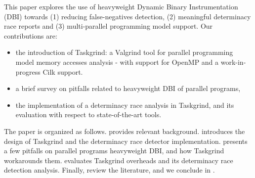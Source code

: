 This paper explores the use of heavyweight Dynamic Binary Instrumentation (DBI) towards (1) reducing false-negatives detection, (2) meaningful determinacy race reports and (3) multi-parallel programming model support.
Our contributions are:
\begin{itemize}
	\item	the introduction of Taskgrind: a Valgrind tool for parallel programming model memory accesses analysis - with support for OpenMP and a work-in-progress Cilk support.
	\item 	a brief survey on pitfalls related to heavyweight DBI of parallel programs,
	\item 	the implementation of a determinacy race analysis in Taskgrind, and its evaluation with respect to state-of-the-art tools.
\end{itemize}

The paper is organized as follows.
 provides relevant background.
 introduces the design of Taskgrind and the determinacy race detector implementation.
 presents a few pitfalls on parallel programs heavyweight DBI, and how Taskgrind workarounds them.
 evaluates Taskgrind overheads and its determinacy race detection analysis.
Finally,  review the literature, and we conclude in .

